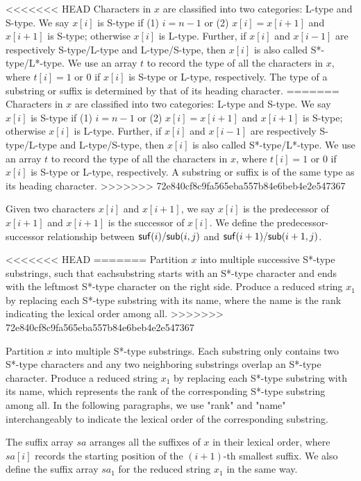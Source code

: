 \documentclass[10pt,journal,compsoc]{IEEEtran}
\begin{document}
<<<<<<< HEAD
Characters in $x$ are classified into two categories: L-type and S-type. We say $x[i]$ is S-type if (1) $i = n - 1$ or (2) $x[i] = x[i + 1]$ and $x[i + 1]$ is S-type; otherwise $x[i]$ is L-type. Further, if $x[i]$ and $x[i - 1]$ are respectively S-type/L-type and L-type/S-type, then $x[i]$ is also called S*-type/L*-type. We use an array $t$ to record the type of all the characters in $x$, where $t[i] = 1$ or $0$ if $x[i]$ is S-type or L-type, respectively. The type of a substring or suffix is determined by that of its heading character.
=======
Characters in $x$ are classified into two categories: L-type and S-type. We say $x[i]$ is S-type if (1) $i = n - 1$ or (2) $x[i] = x[i + 1]$ and $x[i + 1]$ is S-type; otherwise $x[i]$ is L-type. Further, if $x[i]$ and $x[i - 1]$ are respectively S-type/L-type and L-type/S-type, then $x[i]$ is also called S*-type/L*-type. We use an array $t$ to record the type of all the characters in $x$, where $t[i] = 1$ or $0$ if $x[i]$ is S-type or L-type, respectively. A substring or suffix is of the same type as its heading character.
>>>>>>> 72e840cf8c9fa565eba557b84e6beb4e2e547367

Given two characters $x[i]$ and $x[i + 1]$, we say $x[i]$ is the predecessor of $x[i + 1]$ and $x[i + 1]$ is the successor of $x[i]$. We define the predecessor-successor relationship between ${\sf suf}(i)/{\sf sub}(i, j)$ and ${\sf suf}(i + 1)/{\sf sub}(i + 1, j)$.

<<<<<<< HEAD
=======
Partition $x$ into multiple successive S*-type substrings, such that eachsubstring starts with an S*-type character and ends with the leftmost S*-type character on the right side. Produce a reduced string $x_1$ by replacing each S*-type substring with its name, where the name is the rank indicating the lexical order among all.
>>>>>>> 72e840cf8c9fa565eba557b84e6beb4e2e547367

Partition $x$ into multiple S*-type substrings. Each substring only contains two S*-type characters and any two neighboring substrings overlap an S*-type character. Produce a reduced string $x_1$ by replacing each S*-type substring with its name, which represents the rank of the corresponding S*-type substring among all. In the following paragraphs, we use "rank" and "name" interchangeably to indicate the lexical order of the corresponding substring.

The suffix array $sa$ arranges all the suffixes of $x$ in their lexical order, where $sa[i]$ records the starting position of the $(i + 1)$-th smallest suffix. We also define the suffix array $sa_1$ for the reduced string $x_1$ in the same way.
\end{document}
